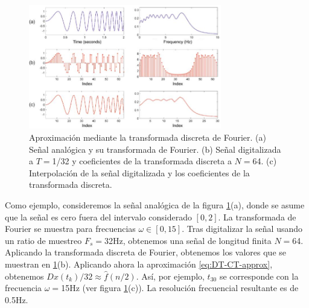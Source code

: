 \documentclass{article}
\begin{document}
\begin{figure}[H]
\centering
    \includegraphics[width=0.75\textwidth]{images/84.jpeg}
    \caption{Aproximación mediante la transformada discreta de Fourier. (a) Señal analógica y su transformada de Fourier. (b) Señal digitalizada a $T=$1/32 y coeficientes de la transformada discreta a $N=$64. (c) Interpolación de la señal digitalizada y los coeficientes de la transformada discreta. \cite[Capítulo 2]{muller2015fundamentals}}
  \label{fig:6.4}
\end{figure}

Como ejemplo, consideremos la señal analógica de la figura \ref{fig:6.4}(a), donde se asume que la señal es cero fuera del intervalo considerado $[0,2]$. La transformada de Fourier se muestra para frecuencias $\omega\in[0,15]$. Tras digitalizar la señal usando un ratio de muestreo $F_s=$32Hz, obtenemos una señal de longitud finita $N=$64. Aplicando la transformada discreta de Fourier, obtenemos los valores que se muestran en \ref{fig:6.4}(b). Aplicando ahora la aproximación \eqref{eq:DT-CT-approx}, obtenemos $Dx(t_k)/32\approx\hat{f}(n/2)$. Así, por ejemplo, $t_30$ se corresponde con la frecuencia $\omega=$15Hz (ver figura \ref{fig:6.4}(c)). La resolución frecuencial resultante es de 0.5Hz.


\newpage
\printbibliography
\end{document}
